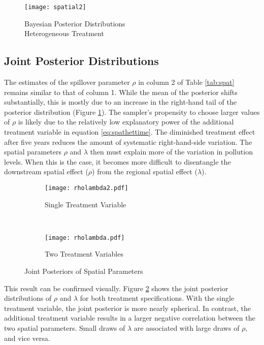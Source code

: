 \documentclass[12pt]{article}
\begin{document}
\begin{figure}[t] \centering 
	\texttt{[image: spatial2]}
	\caption{Bayesian Posterior Distributions \\ Heterogeneous Treatment}
	\label{fig:spatial2}
\end{figure}

\subsection{Joint Posterior Distributions}

The estimates of the spillover parameter $\rho$ in column 2 of Table \ref{tab:spat} remains similar to that of column 1. While the mean of the posterior shifts substantially, this is mostly due to an increase in the right-hand tail of the posterior distribution (Figure \ref{fig:spatial2}). The sampler's propensity to choose larger values of $\rho$ is likely due to the relatively low explanatory power of the additional treatment variable in equation \eqref{eq:spathettime}. The diminished treatment effect after five years reduces the amount of systematic right-hand-side variation. The spatial parameters $\rho$ and $\lambda$ then must explain more of the variation in pollution levels. When this is the case, it becomes more difficult to disentangle the downstream spatial effect ($\rho$) from the regional spatial effect ($\lambda$).

\begin{figure}[t]
    \centering
    \begin{subfigure}[b]{0.5\textwidth}
        \centering
        \texttt{[image: rholambda2.pdf]}
        \caption{Single Treatment Variable}
    \end{subfigure}%
    ~ 
    \begin{subfigure}[b]{0.5\textwidth}
        \centering
        \texttt{[image: rholambda.pdf]}
        \caption{Two Treatment Variables}
    \end{subfigure}
    \caption{Joint Posteriors of Spatial Parameters}
    \label{fig:joint}
\end{figure}

This result can be confirmed visually. Figure \ref{fig:joint} shows the joint posterior distributions of $\rho$ and $\lambda$ for both treatment specifications. With the single treatment variable, the joint posterior is more nearly spherical. In contrast, the additional treatment variable results in a larger negative correlation between the two spatial parameters. Small draws of $\lambda$ are associated with large draws of $\rho$, and vice versa. 
	
\end{document}
